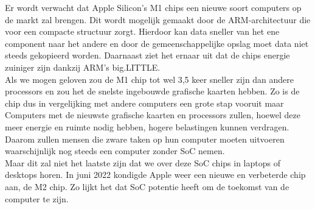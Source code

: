 \documentclass{hogent-article}
\begin{document}
Er wordt verwacht dat Apple Silicon's M1 chips een nieuwe soort computers op de markt zal brengen. Dit wordt mogelijk gemaakt door de ARM-architectuur die voor een compacte structuur zorgt. Hierdoor kan data sneller van het ene component naar het andere en door de gemeenschappelijke opslag moet data niet steeds gekopieerd worden. Daarnaast ziet het ernaar uit dat de chips energie zuiniger zijn dankzij ARM's big.LITTLE. \\
Als we \textcite{Apple2020} mogen geloven zou de M1 chip tot wel 3,5 keer sneller zijn dan andere processors en zou het de snelste ingebouwde grafische kaarten hebben. Zo is de chip dus in vergelijking met andere computers een grote stap vooruit maar Computers met de nieuwste grafische kaarten en processors zullen, hoewel deze meer energie en ruimte nodig hebben, hogere belastingen kunnen verdragen. Daarom zullen mensen die zware taken op hun computer moeten uitvoeren waarschijnlijk nog steeds een computer zonder SoC nemen. \\
Maar dit zal niet het laatste zijn dat we over deze SoC chips in laptops of desktops horen. In juni 2022 kondigde Apple weer een nieuwe en verbeterde chip aan, de M2 chip. Zo lijkt het dat SoC potentie heeft om de toekomst van de computer te zijn.


\printbibliography[heading=bibintoc]
\end{document}
